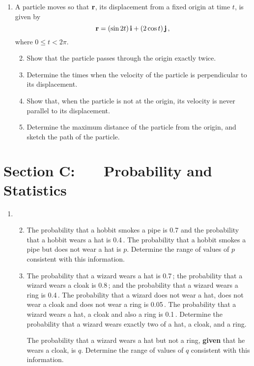 \documentclass[a4, 11pt]{report}
\newlength{\qspace}
\newcounter{qnumber}
\newenvironment{question}%
 {\vspace{\qspace}
  \begin{enumerate}[\bfseries 1\quad][10]%
    \setcounter{enumi}{\value{qnumber}}%
    \item%
 }
{
  \end{enumerate}
  \filbreak
  \stepcounter{qnumber}
 }
\newenvironment{questionparts}[1][1]%
 {
  \begin{enumerate}[\bfseries (i)]%
    \setcounter{enumii}{#1}
    \addtocounter{enumii}{-1}
    \setlength{\itemsep}{5mm}
    \setlength{\parskip}{8pt}
 }
 {
  \end{enumerate}
 }
\def\le{\leqslant}
\def\l{\left(}
\def\r{\right)}
\begin{document}
\begin{question}
A particle moves so that ${\bf r}$, 
its displacement from a fixed origin at time $t$, 
is given by 
\[{\bf r} = \l \sin{2t} \r {\bf i} + \l 2\cos t \r \bf{j}\,,\] 
where $0 \le t < 2\pi$.
\begin{questionparts}
\item  Show that the particle passes through the origin exactly twice.

\item  Determine 
the times when the velocity of the particle is perpendicular to its displacement. 

\item  Show that, when the particle is not at the origin,
its velocity is never parallel to its displacement.

\item  Determine the maximum distance of the particle from the origin, 
and sketch the path of the particle.
\end{questionparts}
\end{question}
	

	
	\newpage
\section*{Section C: \ \ \ Probability and Statistics}


\begin{question}
\begin{questionparts}
\item The probability that a hobbit smokes a pipe is 0.7 
and the probability that a hobbit wears a hat is 0.4\,. 
The probability that a hobbit smokes a pipe but does not wear a hat is $p$. 
Determine the range of values of $p$ consistent with this information.

\item  The probability that a wizard wears a hat is 0.7\,;
the probability that a wizard wears a cloak is 0.8\,; 
and the probability that a wizard wears a ring is 0.4\,. 
The probability that a wizard does not wear a hat, 
does not wear a cloak and does not wear a ring is 0.05\,. 
The probability that a wizard wears a hat, a cloak and also a ring is 0.1\,. 
Determine the probability that a wizard wears exactly two of a hat, a cloak, and a ring. 


The probability that a wizard wears a hat 
but not a ring, {\bf given} that he wears a cloak, is $q$. 
Determine the range of values of $q$ consistent with this information.
\end{questionparts}
\end{question}
\end{document}
